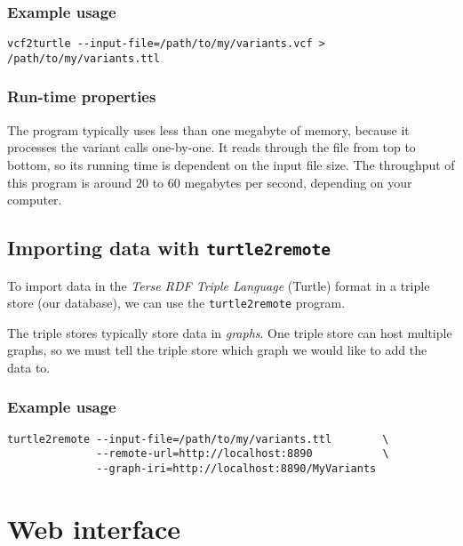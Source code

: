 \documentclass[11pt,a4paper,oneside]{book}
\begin{document}
\subsection{Example usage}

\begin{siderules}
\begin{verbatim}
vcf2turtle --input-file=/path/to/my/variants.vcf > /path/to/my/variants.ttl
\end{verbatim}
\end{siderules}

\subsection{Run-time properties}

  The program typically uses less than one megabyte of memory, because it
  processes the variant calls one-by-one.  It reads through the file from top
  to bottom, so its running time is dependent on the input file size.  The
  throughput of this program is around $20$ to $60$ megabytes per second,
  depending on your computer.

\section{Importing data with \texttt{turtle2remote}}
\label{sec:turtle2remote}

  To import data in the \emph{Terse RDF Triple Language} (Turtle) format in
  a triple store (our database), we can use the \texttt{turtle2remote} program.

  The triple stores typically store data in \emph{graphs}.  One triple store
  can host multiple graphs, so we must tell the triple store which graph we
  would like to add the data to.

\subsection{Example usage}

\begin{siderules}
\begin{verbatim}
turtle2remote --input-file=/path/to/my/variants.ttl        \
              --remote-url=http://localhost:8890           \
              --graph-iri=http://localhost:8890/MyVariants
\end{verbatim}
\end{siderules}

\chapter{Web interface}
\label{chap:web-interface}
\end{document}
